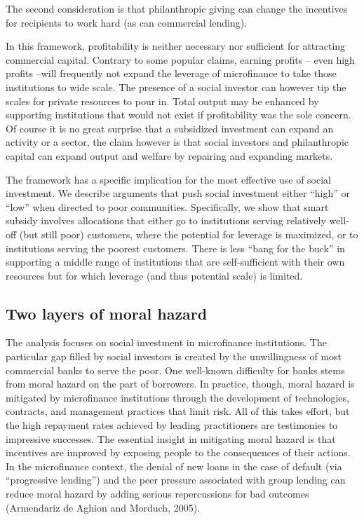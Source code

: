\documentclass{article} %
\begin{document}
The second consideration is that philanthropic giving can change the incentives for recipients to work hard (as can commercial lending). 

In this framework, profitability is neither necessary nor sufficient for attracting commercial capital. Contrary to some popular claims, earning profits -- even high profits --will frequently not expand the leverage of microfinance to take those institutions to wide scale. The presence of a social investor can however tip the scales for private resources to pour in. Total output may be enhanced by supporting institutions that would not exist if profitability was the sole concern.  Of course it is no great surprise that a subsidized investment can expand an activity or a sector, the claim however is that social investors and philanthropic capital can expand output and welfare by repairing and expanding markets. 

The framework has a specific implication for the most effective use of social investment. We describe arguments that push social investment either ``high'' or ``low'' when directed to poor communities. Specifically, we show that smart subsidy involves allocations that either go to institutions serving relatively well-off (but still poor) customers, where the potential for leverage is maximized, or to institutions serving the poorest customers. There is less ``bang for the buck'' in supporting a middle range of institutions that are self-sufficient with their own resources but for which leverage (and thus potential scale) is limited. 

\noindent 
\subsection{Two layers of moral hazard}

The analysis focuses on social investment in microfinance institutions. The particular gap filled by social investors is created by the unwillingness of most commercial banks to serve the poor. One well-known difficulty for banks stems from moral hazard on the part of borrowers. In practice, though, moral hazard is mitigated by microfinance institutions through the development of technologies, contracts, and management practices that limit risk. All of this takes effort, but the high repayment rates achieved by leading practitioners are testimonies to impressive successes. The essential insight in mitigating moral hazard is that incentives are improved by exposing people to the consequences of their actions. In the microfinance context, the denial of new loans in the case of default (via ``progressive lending'') and the peer pressure associated with group lending can reduce moral hazard by adding serious repercussions for bad outcomes (Armendariz de Aghion and Morduch, 2005). 
\end{document}
